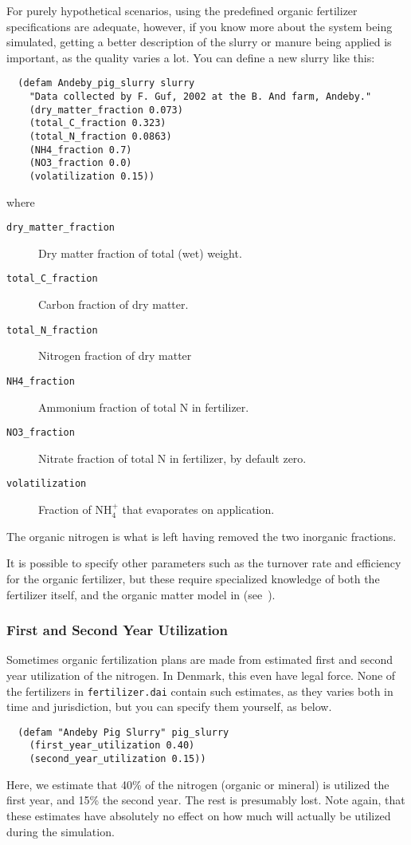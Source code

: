 \documentclass[a4paper,11pt]{article}
\begin{document}
For purely hypothetical scenarios, using the predefined organic
fertilizer specifications are adequate, however, if you know more
about the system being simulated, getting a better description of the
slurry or manure being applied is important, as the quality varies a
lot.  You can define a new slurry like this:
\begin{verbatim}
  (defam Andeby_pig_slurry slurry
    "Data collected by F. Guf, 2002 at the B. And farm, Andeby."
    (dry_matter_fraction 0.073)
    (total_C_fraction 0.323)
    (total_N_fraction 0.0863)
    (NH4_fraction 0.7)
    (NO3_fraction 0.0)
    (volatilization 0.15))
\end{verbatim}
where
\begin{description}
\item[\texttt{dry\_matter\_fraction}] Dry matter fraction of total
  (wet) weight.
\item[\texttt{total\_C\_fraction}] Carbon fraction of dry matter.
\item[\texttt{total\_N\_fraction}] Nitrogen fraction of dry matter
\item[\texttt{NH4\_fraction}] Ammonium fraction of total N in
  fertilizer.
\item[\texttt{NO3\_fraction}] Nitrate fraction of total N in
  fertilizer, by default zero.
\item[\texttt{volatilization}] Fraction of NH$_4^+$ that evaporates on
  application.
\end{description}
The organic nitrogen is what is left having removed the two inorganic
fractions.

It is possible to specify other parameters such as the turnover rate
and efficiency for the organic fertilizer, but these require
specialized knowledge of both the fertilizer itself, and the organic
matter model in \daisy{} (see~\cite{daisy-new}).

\subsubsection{First and Second Year Utilization}

Sometimes organic fertilization plans are made from estimated first
and second year utilization of the nitrogen.  In Denmark, this even
have legal force.  None of the fertilizers in \texttt{fertilizer.dai}
contain such estimates, as they varies both in time and jurisdiction,
but you can specify them yourself, as below.
\begin{verbatim}
  (defam "Andeby Pig Slurry" pig_slurry
    (first_year_utilization 0.40)
    (second_year_utilization 0.15))
\end{verbatim}
Here, we estimate that 40\% of the nitrogen (organic or mineral) is
utilized the first year, and 15\% the second year.  The rest is
presumably lost.  Note again, that these estimates have absolutely no
effect on how much will actually be utilized during the simulation.
\end{document}
